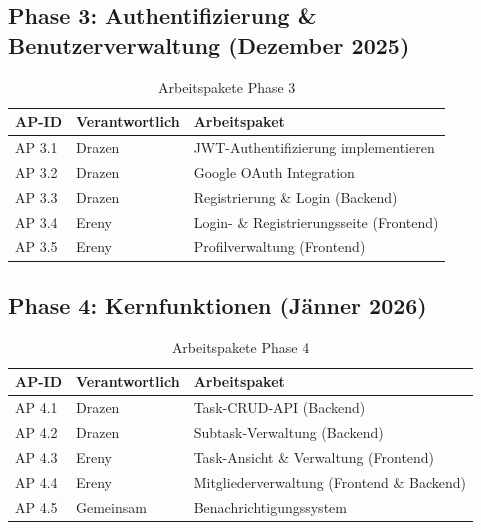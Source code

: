 \subsection{Phase 3: Authentifizierung \& Benutzerverwaltung
  (Dezember 2025)}

\begin{table}[H]
    \centering
    \caption{Arbeitspakete Phase 3}
    \begin{tabularx}{\textwidth}{llX}
        \toprule
        \textbf{AP-ID} & \textbf{Verantwortlich} & \textbf{Arbeitspaket} \\
        \midrule
        AP 3.1 & Drazen & JWT-Authentifizierung implementieren \\
        AP 3.2 & Drazen & Google OAuth Integration \\
        AP 3.3 & Drazen & Registrierung \& Login (Backend) \\
        AP 3.4 & Ereny  & Login- \& Registrierungsseite (Frontend) \\
        AP 3.5 & Ereny  & Profilverwaltung (Frontend) \\
        \bottomrule
    \end{tabularx}
    \label{tab:ap3}
\end{table}

\subsection{Phase 4: Kernfunktionen (Jänner 2026)}

\begin{table}[H]
    \centering
    \caption{Arbeitspakete Phase 4}
    \begin{tabularx}{\textwidth}{llX}
        \toprule
        \textbf{AP-ID} & \textbf{Verantwortlich} & \textbf{Arbeitspaket} \\
        \midrule
        AP 4.1 & Drazen & Task-CRUD-API (Backend) \\
        AP 4.2 & Drazen & Subtask-Verwaltung (Backend) \\
        AP 4.3 & Ereny  & Task-Ansicht \& Verwaltung (Frontend) \\
        AP 4.4 & Ereny  & Mitgliederverwaltung (Frontend \& Backend) \\
        AP 4.5 & Gemeinsam & Benachrichtigungssystem \\
        \bottomrule
    \end{tabularx}
    \label{tab:ap4}
\end{table}

